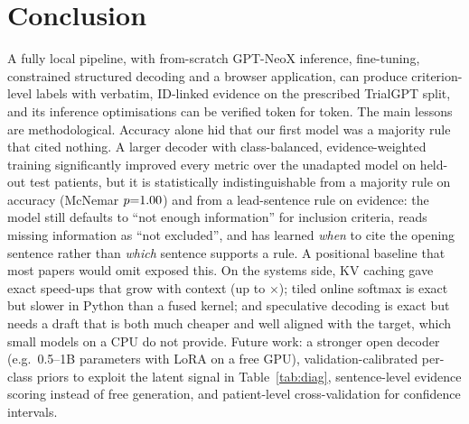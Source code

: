 \section{Conclusion}
A fully local pipeline, with from-scratch GPT-NeoX inference, fine-tuning, constrained structured decoding and a browser application, can produce criterion-level labels with verbatim, ID-linked evidence on the prescribed TrialGPT split, and its inference optimisations can be verified token for token. The main lessons are methodological. Accuracy alone hid that our first model was a majority rule that cited nothing. A larger decoder with class-balanced, evidence-weighted training significantly improved every metric over the unadapted model on held-out test patients, but it is statistically indistinguishable from a majority rule on accuracy (McNemar $p{=}1.00$) and from a lead-sentence rule on evidence: the model still defaults to ``not enough information'' for inclusion criteria, reads missing information as ``not excluded'', and has learned \emph{when} to cite the opening sentence rather than \emph{which} sentence supports a rule. A positional baseline that most papers would omit exposed this. On the systems side, KV caching gave exact speed-ups that grow with context (up to \CacheL$\times$); tiled online softmax is exact but slower in Python than a fused kernel; and speculative decoding is exact but needs a draft that is both much cheaper and well aligned with the target, which small models on a CPU do not provide. Future work: a stronger open decoder (e.g.\ 0.5--1B parameters with LoRA on a free GPU), validation-calibrated per-class priors to exploit the latent signal in Table~\ref{tab:diag}, sentence-level evidence scoring instead of free generation, and patient-level cross-validation for confidence intervals.

